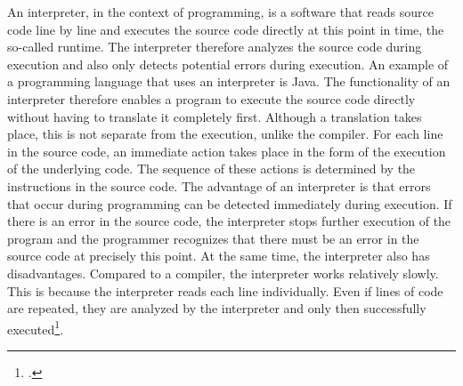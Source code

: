 An interpreter, in the context of programming, is a software that reads source code line by line and executes the source code directly at this point in time, the so-called runtime. The interpreter therefore analyzes the source code during execution and also only detects potential errors during execution. An example of a programming language that uses an interpreter is Java.
The functionality of an interpreter therefore enables a program to execute the source code directly without having to translate it completely first. Although a translation takes place, this is not separate from the execution, unlike the compiler. For each line in the source code, an immediate action takes place in the form of the execution of the underlying code. The sequence of these actions is determined by the instructions in the source code.
The advantage of an interpreter is that errors that occur during programming can be detected immediately during execution. If there is an error in the source code, the interpreter stops further execution of the program and the programmer recognizes that there must be an error in the source code at precisely this point.
At the same time, the interpreter also has disadvantages. Compared to a compiler, the interpreter works relatively slowly. This is because the interpreter reads each line individually. Even if lines of code are repeated, they are analyzed by the interpreter and only then successfully executed\footcite{xovi_was_2019-1}.